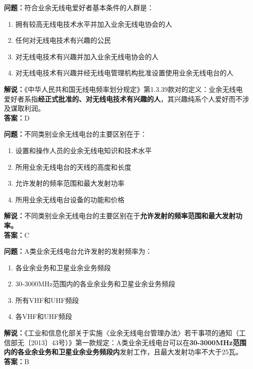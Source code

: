 \documentclass{ctexbook}
\begin{document}
\bigskip


\noindent\textbf{问题：}符合业余无线电爱好者基本条件的人群是：
\begin{enumerate}[label=\Alph*), leftmargin=3em]
	\item 拥有较高无线电技术水平并加入业余无线电协会的人
	\item 任何对无线电技术有兴趣的公民
	\item 对无线电技术有兴趣并加入业余无线电协会的人
	\item 对无线电技术有兴趣并经无线电管理机构批准设置使用业余无线电台的人
\end{enumerate}
\noindent\textbf{解说：}《中华人民共和国无线电频率划分规定》第1.3.39款对的定义：业余无线电爱好者系指\textbf{经正式批准的、对无线电技术有兴趣的人}，其兴趣纯系个人爱好而不涉及谋取利润。\\\noindent\textbf{答案：}D


\bigskip


\noindent\textbf{问题：}不同类别业余无线电台的主要区别在于：
\begin{enumerate}[label=\Alph*), leftmargin=3em]
	\item 设置和操作人员的业余无线电知识和技术水平
	\item 所用业余无线电台的天线的高度和长度
	\item 允许发射的频率范围和最大发射功率
	\item 所用业余无线电台设备的功能和价格
\end{enumerate}
\noindent\textbf{解说：}不同类别业余无线电台的主要区别在于\textbf{允许发射的频率范围和最大发射功率。}\\\noindent\textbf{答案：}C



\bigskip


\noindent\textbf{问题：}A类业余无线电台允许发射的发射频率为：
\begin{enumerate}[label=\Alph*), leftmargin=3em]
	\item 各业余业务和卫星业余业务频段
	\item 30-3000MHz范围内的各业余业务和卫星业余业务频段
	\item 所有VHF和UHF频段
	\item 各VHF和UHF频段
\end{enumerate}
\noindent\textbf{解说：}《工业和信息化部关于实施〈业余无线电台管理办法〉若干事项的通知（工信部无〔2013〕43号）》第一款规定：A类业余无线电台可以在\textbf{30-3000MHz范围内的各业余业务和卫星业余业务频段内}发射工作，且最大发射功率不大于25瓦。\\\noindent\textbf{答案：}B
\end{document}

